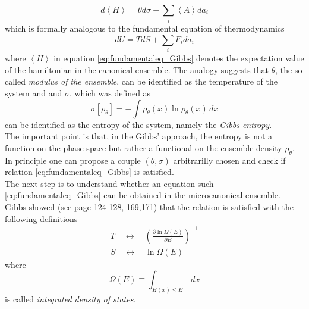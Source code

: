 \begin{equation}
    d\left\langle H \right\rangle = \theta d\sigma - \sum_i \left\langle A \right\rangle da_i
    \label{eq:fundamentaleq_Gibbs}
\end{equation}
which is formally analogous to the fundamental equation of thermodynamics
\begin{equation*}
    dU = TdS + \sum_i F_i da_i
\end{equation*}
where $\left\langle H \right\rangle$ in equation \ref{eq:fundamentaleq_Gibbs} denotes the expectation value of the hamiltonian in the canonical ensemble.
The analogy suggests that $\theta$, the so called \emph{modulus of the ensemble}, can be identified as the temperature of the system and  and $\sigma$, which was defined as
\begin{equation*}
    \sigma[\rho_{\theta}] = - \int \rho_{\theta}(x) \ln \rho_{\theta}(x) \, dx
\end{equation*}
can be identified as the entropy of the system, namely the \emph{Gibbs entropy}. \\
The important point is that, in the Gibbs' approach, the entropy is not a function on the phase space but rather a functional on the ensemble density $\rho_{\theta}$.
In principle one can propose a couple $(\theta, \sigma)$ arbitrarilly chosen and check if relation \ref{eq:fundamentaleq_Gibbs} is satisfied. \\
The next step is to understand whether an equation such \ref{eq:fundamentaleq_Gibbs} can be obtained in the microcanonical ensemble. Gibbs showed (see \cite{gibbs_2010} page 124-128, 169,171) that the relation is satisfied with the following definitions
\begin{gather*}
    T \quad \longleftrightarrow \quad \left(\frac{\partial \ln \Omega(E)}{\partial E}\right)^{-1} \\
    S \quad \longleftrightarrow \quad \ln \Omega(E)
\end{gather*}
where 
\begin{equation}
    \Omega(E) \equiv \int_{H(x) \leq E} \, dx
    \label{eq:Omega_E}
\end{equation}
is called \emph{integrated density of states}. 

